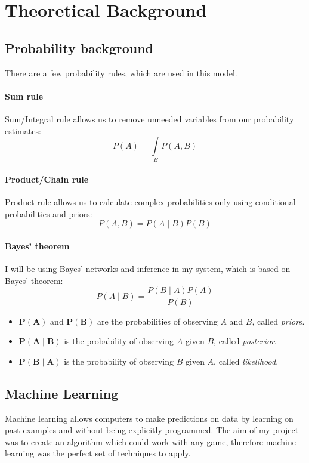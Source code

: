 \documentclass[12pt,a4paper]{book}
\begin{document}
\section{Theoretical Background}
\subsection{Probability background}
There are a few probability rules, which are used in this model.
\paragraph{Sum rule}
Sum/Integral rule allows us to remove unneeded variables from our probability estimates:
\begin{equation}
P(A) = \int\limits_{B}P(A,B)
\end{equation}
\paragraph{Product/Chain rule}
Product rule allows us to calculate complex probabilities only using conditional probabilities and priors:
\begin{equation}
P(A,B) = P(A\mid B)P(B)
\end{equation} 
\paragraph{Bayes' theorem}
I will be using Bayes' networks and inference in my system, which is based on Bayes' theorem:
\begin{equation}
P(A\mid B) = \frac{P(B\mid A)P(A)}{P(B)}
\end{equation}
\begin{itemize}
\item $\boldsymbol{P(A)}$ and $\boldsymbol{P(B)}$ are the probabilities of observing $A$ and $B$, called \emph{prior}s.
\item $\boldsymbol{P(A \mid B)}$ is the probability of observing $A$ given $B$, called \emph{posterior}.
\item $\boldsymbol{P(B \mid A)}$ is the probability of observing $B$ given $A$, called \emph{likelihood}.
\end{itemize}
\subsection{Machine Learning}
Machine learning allows computers to make predictions on data by learning on past examples and without being explicitly programmed.
The aim of my project was to create an algorithm which could work with any game, therefore machine learning was the perfect set of techniques to apply.
\end{document}
